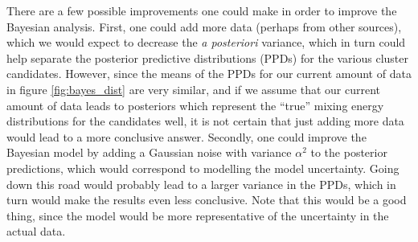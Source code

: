 \documentclass[11pt,a4paper]{article}
\begin{document}
There are a few possible improvements one could make in order to improve the Bayesian analysis. First, one could add more data (perhaps from other sources), which we would expect to decrease the \textit{a posteriori} variance, which in turn could help separate the posterior predictive distributions (PPDs) for the various cluster candidates. However, since the means of the PPDs for our current amount of data in figure \ref{fig:bayes_dist} are very similar, and if we assume that our current amount of data leads to posteriors which represent the ``true'' mixing energy distributions for the candidates well, it is not certain that just adding more data would lead to a more conclusive answer. Secondly, one could improve the Bayesian model by adding a Gaussian noise with variance $\alpha^2$ to the posterior predictions, which would correspond to modelling the model uncertainty. Going down this road would probably lead to a larger variance in the PPDs, which in turn would make the results even less conclusive. Note that this would be a good thing, since the model would be more representative of the uncertainty in the actual data. 




\printbibliography
\end{document}
